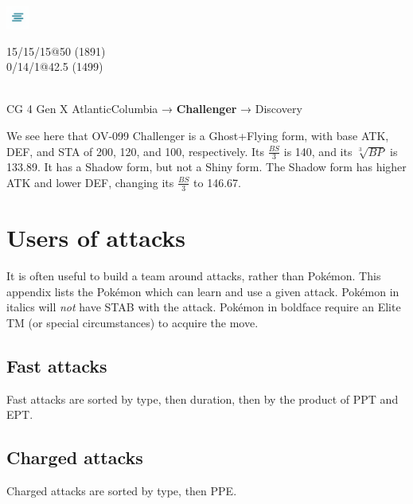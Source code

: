 \documentclass[ebook,10pt,openany,oneside]{memoir}
\begin{document}
\begin{speciesbox}[title=OV-099 Challenger,title style={left color=Flying,right color=Ghost},after title={\hfill 200 120 100 140.00 133.89}]
\begin{minipage}{0.3\linewidth}
\includegraphics[height=2em,keepaspectratio]{images/fog.png}
\end{minipage}
\begin{minipage}{0.7\linewidth}\raggedleft{}
\vfill{}
  15/15/15@50 (1891)\\
  0/14/1@42.5 (1499)
\end{minipage}\\
CG 4 Gen X Atlantic\hfill{}Columbia → \textbf{Challenger} → Discovery
\end{speciesbox}
\bigskip\noindent{}We see here that OV-099 Challenger is a Ghost+Flying form, with base ATK, DEF, and STA
of 200, 120, and 100, respectively. Its $\frac{BS}{3}$ is 140, and its $\sqrt[3]{BP}$ is 133.89.
It has a Shadow form, but not a Shiny form. The Shadow form has higher ATK and lower DEF, changing
its $\frac{BS}{3}$ to 146.67.
\clearpage


\chapter{Users of attacks\label{chap:attackemployers}}
It is often useful to build a team around attacks, rather than Pokémon.
This appendix lists the Pokémon which can learn and use a given attack.
Pokémon in italics will \textit{not} have STAB with the attack.
Pokémon in boldface require an Elite TM (or special circumstances) to acquire the move.
\section{Fast attacks\label{sec:usersfast}}
Fast attacks are sorted by type, then duration, then by the product of PPT and EPT\@.

\section{Charged attacks\label{sec:userscharged}}
Charged attacks are sorted by type, then PPE\@.

\backmatter

\end{document}
